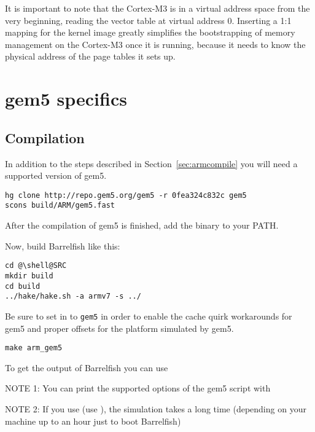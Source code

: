 \documentclass[a4paper,twoside]{report} %
\begin{document}
It is important to note that the Cortex-M3 is in a virtual address
space from the very beginning, reading the vector table at virtual
address 0. Inserting a 1:1 mapping for the kernel image greatly
simplifies the bootstrapping of memory management on the Cortex-M3
once it is running, because it needs to know the physical address of
the page tables it sets up.

\section{gem5 specifics}

\subsection{Compilation}


In addition to the steps described in Section~\ref{sec:armcompile} you
will need a supported version of gem5.

\begin{lstlisting}
hg clone http://repo.gem5.org/gem5 -r 0fea324c832c gem5
scons build/ARM/gem5.fast
\end{lstlisting}
After the compilation of gem5 is finished, add the binary to your PATH.

Now, build Barrelfish like this:
\begin{lstlisting}
cd @\shell@SRC
mkdir build
cd build
../hake/hake.sh -a armv7 -s ../
\end{lstlisting}

Be sure to set  in
 to \texttt{gem5} in order to enable
the cache quirk workarounds for gem5 and proper offsets for the
platform simulated by gem5.

\begin{lstlisting}
make arm_gem5
\end{lstlisting}

To get the output of Barrelfish you can use 

NOTE 1: You can print the supported options of the gem5 script with

NOTE 2: If you use  (use ), the simulation takes a long time (depending on
your machine up to an hour just to boot Barrelfish)
\end{document}
